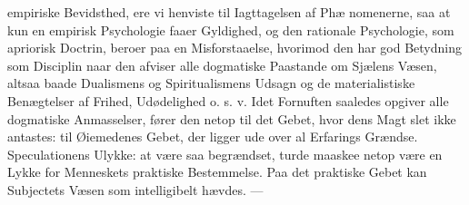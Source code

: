 \documentclass[12pt,a4paper]{book}
\begin{document}
empiriske Bevidsthed, ere vi henviste til Iagttagelsen af Phæ\-%
nomenerne, saa at kun en empirisk Psychologie faaer Gyldighed,
og den rationale Psychologie, som apriorisk Doctrin, beroer paa en
Misforstaaelse, hvorimod den har god Betydning som Disciplin
naar den afviser alle dogmatiske Paastande om Sjælens Væsen,
altsaa baade Dualismens og Spiritualismens Udsagn og de
materialistiske Benægtelser af Frihed, Udødelighed o. s. v. Idet
Fornuften saaledes opgiver alle dogmatiske Anmasselser, fører
den netop til det Gebet, hvor dens Magt slet ikke antastes:
til Øiemedenes Gebet, der ligger ude over al Erfarings Grændse.
Speculationens Ulykke: at være saa begrændset, turde maaskee
netop være en Lykke for Menneskets praktiske Bestemmelse.
Paa det praktiske Gebet kan Subjectets Væsen som intelligibelt
hævdes. ---
\end{document}

